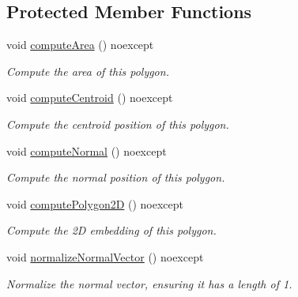 \subsection*{Protected Member Functions}
\begin{DoxyCompactItemize}
\item 
\mbox{\label{classDcel_1_1FaceT_a3a3bfa74a7c07252a2a904206678bb66}} 
void \hyperlink{classDcel_1_1FaceT_a3a3bfa74a7c07252a2a904206678bb66}{compute\+Area} () noexcept
\begin{DoxyCompactList}\small\item\em Compute the area of this polygon. \end{DoxyCompactList}\item 
\mbox{\label{classDcel_1_1FaceT_a7aded1c77a78a38115e5388311ed25b0}} 
void \hyperlink{classDcel_1_1FaceT_a7aded1c77a78a38115e5388311ed25b0}{compute\+Centroid} () noexcept
\begin{DoxyCompactList}\small\item\em Compute the centroid position of this polygon. \end{DoxyCompactList}\item 
\mbox{\label{classDcel_1_1FaceT_a574abc710dd63e88503d4011f27adf89}} 
void \hyperlink{classDcel_1_1FaceT_a574abc710dd63e88503d4011f27adf89}{compute\+Normal} () noexcept
\begin{DoxyCompactList}\small\item\em Compute the normal position of this polygon. \end{DoxyCompactList}\item 
\mbox{\label{classDcel_1_1FaceT_a863d94c15412e535ca62f9cd52eead5f}} 
void \hyperlink{classDcel_1_1FaceT_a863d94c15412e535ca62f9cd52eead5f}{compute\+Polygon2D} () noexcept
\begin{DoxyCompactList}\small\item\em Compute the 2D embedding of this polygon. \end{DoxyCompactList}\item 
\mbox{\label{classDcel_1_1FaceT_aae0f6ac54d41666fa4b6182c65e5e444}} 
void \hyperlink{classDcel_1_1FaceT_aae0f6ac54d41666fa4b6182c65e5e444}{normalize\+Normal\+Vector} () noexcept
\begin{DoxyCompactList}\small\item\em Normalize the normal vector, ensuring it has a length of 1. \end{DoxyCompactList}\item 

\end{DoxyCompactItemize}
